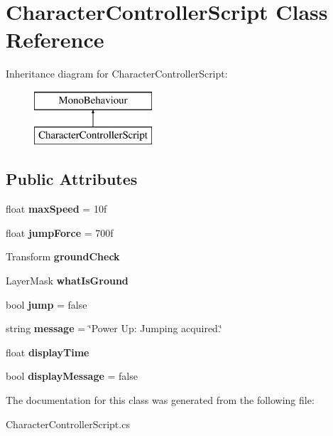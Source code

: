 \hypertarget{class_character_controller_script}{}\section{Character\+Controller\+Script Class Reference}
\label{class_character_controller_script}
Inheritance diagram for Character\+Controller\+Script\+:\begin{figure}[H]
\begin{center}
\leavevmode
\includegraphics[height=2.000000cm]{class_character_controller_script}
\end{center}
\end{figure}
\subsection*{Public Attributes}
\begin{DoxyCompactItemize}
\item 
\hypertarget{class_character_controller_script_ab0158aad94e83ea978139fc8e3946b5a}{}\label{class_character_controller_script_ab0158aad94e83ea978139fc8e3946b5a} 
float {\bfseries max\+Speed} = 10f
\item 
\hypertarget{class_character_controller_script_a7d59fd6ab8ee7ab3b91206457bbd19f7}{}\label{class_character_controller_script_a7d59fd6ab8ee7ab3b91206457bbd19f7} 
float {\bfseries jump\+Force} = 700f
\item 
\hypertarget{class_character_controller_script_a7f84311277b867c89b5e3a8b640d6a44}{}\label{class_character_controller_script_a7f84311277b867c89b5e3a8b640d6a44} 
Transform {\bfseries ground\+Check}
\item 
\hypertarget{class_character_controller_script_a5d0d8ebbb1d5c74bde4ada1b14e88ced}{}\label{class_character_controller_script_a5d0d8ebbb1d5c74bde4ada1b14e88ced} 
Layer\+Mask {\bfseries what\+Is\+Ground}
\item 
\hypertarget{class_character_controller_script_ae05fea6fa89d070f3897f6038bf0407f}{}\label{class_character_controller_script_ae05fea6fa89d070f3897f6038bf0407f} 
bool {\bfseries jump} = false
\item 
\hypertarget{class_character_controller_script_ae9027bd9082b11140a70691a44202d10}{}\label{class_character_controller_script_ae9027bd9082b11140a70691a44202d10} 
string {\bfseries message} = \char`\"{}Power Up\+: Jumping acquired.\char`\"{}
\item 
\hypertarget{class_character_controller_script_a5a902e98061e6f9656cf0e7deb42b439}{}\label{class_character_controller_script_a5a902e98061e6f9656cf0e7deb42b439} 
float {\bfseries display\+Time}
\item 
\hypertarget{class_character_controller_script_ad5e60344614af133fa68c6b5e8b50192}{}\label{class_character_controller_script_ad5e60344614af133fa68c6b5e8b50192} 
bool {\bfseries display\+Message} = false
\end{DoxyCompactItemize}


The documentation for this class was generated from the following file\+:\begin{DoxyCompactItemize}
\item 
Character\+Controller\+Script.\+cs\end{DoxyCompactItemize}
